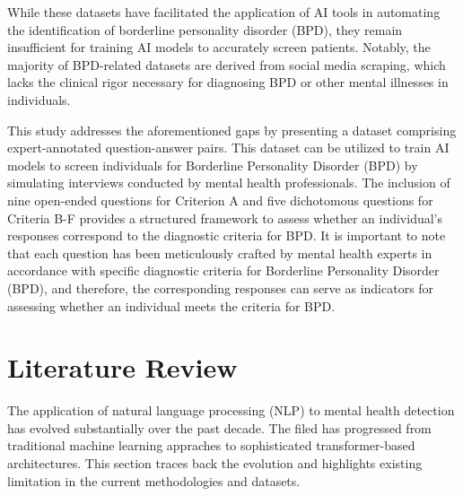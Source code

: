 \documentclass{article}
\begin{document}
While these datasets have facilitated the application of AI tools in automating the identification of borderline personality disorder (BPD), they remain insufficient for training AI models to accurately screen patients. Notably, the majority of BPD-related datasets are derived from social media scraping, which lacks the clinical rigor necessary for diagnosing BPD or other mental illnesses in individuals. 

This study addresses the aforementioned gaps by presenting a dataset comprising expert-annotated question-answer pairs. This dataset can be utilized to train AI models to screen individuals for Borderline Personality Disorder (BPD) by simulating interviews conducted by mental health professionals. The inclusion of nine open-ended questions for Criterion A and five dichotomous questions for Criteria B-F provides a structured framework to assess whether an individual's responses correspond to the diagnostic criteria for BPD. It is important to note that each question has been meticulously crafted by mental health experts in accordance with specific diagnostic criteria for Borderline Personality Disorder (BPD), and therefore, the corresponding responses can serve as indicators for assessing whether an individual meets the criteria for BPD.


\section{Literature Review}\label{sec1}





The application of natural language processing (NLP) to mental health detection has evolved substantially over the past decade. The filed has progressed from traditional machine learning appraches to sophisticated transformer-based architectures. This section traces back the evolution and highlights existing limitation in the current methodologies and datasets.
\end{document}
